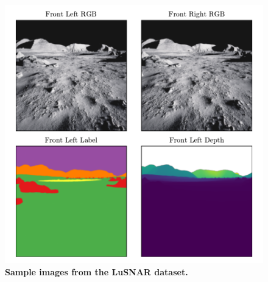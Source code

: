 
\begin{figure}[t]
	\centering
	\includegraphics[width=\linewidth]{figures/sample_lusnar.pdf}
	\caption{\bfseries Sample images from the LuSNAR dataset.}
	\label{fig:sample_lusnar}
\end{figure}


